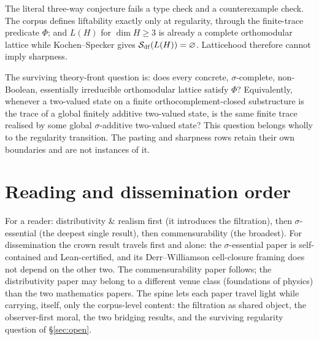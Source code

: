 The literal three-way conjecture fails a type check and a counterexample check.
The corpus defines liftability exactly only at regularity, through the
finite-trace predicate $\Phi$; and $L(H)$ for $\dim H\geq3$ is already a complete
orthomodular lattice while Kochen--Specker gives $\mathcal{S}_{\mathrm{df}}(L(H))=\varnothing$.
Latticehood therefore cannot imply sharpness.

The surviving theory-front question is: does every concrete,
$\sigma$-complete, non-Boolean, essentially irreducible orthomodular lattice
satisfy $\Phi$? Equivalently, whenever a two-valued state on a finite
orthocomplement-closed substructure is the trace of a global finitely additive
two-valued state, is the same finite trace realised by some global
$\sigma$-additive two-valued state? This question belongs wholly to the
regularity transition. The pasting and sharpness rows retain their own
boundaries and are not instances of it.


\section{Reading and dissemination order}\label{sec:order}

For a reader: distributivity \& realism first (it introduces the filtration),
then $\sigma$-essential (the deepest single result), then commensurability (the
broadest). For dissemination the crown result travels first and alone: the
$\sigma$-essential paper is self-contained and Lean-certified, and its
Derr--Williamson cell-closure framing does not depend on the other two. The
commensurability paper follows; the distributivity paper may belong to a
different venue class (foundations of physics) than the two mathematics papers.
The spine lets each paper travel light while carrying, itself, only the
corpus-level content: the filtration as shared object, the observer-first moral,
the two bridging results, and the surviving regularity question of
\S\ref{sec:open}.
